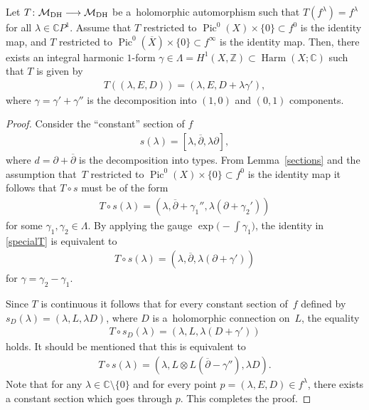 \begin{Lemma}\label{almost-id} Let $T \colon {\mathcal M}_{\rm DH} \longrightarrow {\mathcal M}_{\rm DH}$ be a~holomorphic automorphism such that
$T(f^\lambda) = f^\lambda$ for all $\lambda \in \mathbb CP^1$. Assume that $T$ restricted to $\operatorname{Pic}^0(X)\times\{0\} \subset f^0$ is the
identity map, and $T$ restricted to $\operatorname{Pic}^0(\overline{X})\times\{0\} \subset f^\infty$ is the identity map. Then, there exists an integral harmonic $1$-form $\gamma \in \Lambda = H^1(X, \mathbb Z) \subset \operatorname{Harm}(X; \mathbb C)$ such that $T$ is given by
\begin{gather*}T((\lambda, E, D)) = (\lambda, E, D+\lambda\gamma') ,\end{gather*}
where $\gamma = \gamma'+\gamma''$ is the decomposition into $(1,0)$ and $(0,1)$ components.
\end{Lemma}

\begin{proof}
Consider the ``constant'' section of $f$
\begin{gather*}s(\lambda) = [\lambda, \overline{\partial}, \lambda \partial],\end{gather*}
where $d = \partial+\overline{\partial}$ is the decomposition into types. From Lemma~\ref{sections} and the assumption that~$T$ restricted to $\operatorname{Pic}^0(X)\times\{0\} \subset f^0$ is the identity map it follows that $T\circ s$ must be of the form
\begin{gather}\label{specialT}
T\circ s(\lambda) = (\lambda, \overline{\partial}+\gamma_1'', \lambda (\partial+\gamma_2'))
\end{gather}
for some $\gamma_1, \gamma_2 \in \Lambda$. By applying the gauge $\exp\big({-}\int\gamma_1\big)$, the identity in \eqref{specialT} is equivalent to
\begin{gather*}T\circ s(\lambda) = (\lambda, \overline{\partial}, \lambda (\partial+\gamma'))\end{gather*}
 for $\gamma = \gamma_2-\gamma_1$.

Since $T$ is continuous it follows that for every constant section of~$f$ def\/ined by $s_D(\lambda) = (\lambda, L, \lambda D)$, where $D$ is a~holomorphic connection on~$L$, the equality
\begin{gather*}T\circ s_D(\lambda) = (\lambda, L, \lambda (D+\gamma'))\end{gather*}
holds. It should be mentioned that this is equivalent to
\begin{gather*}T\circ s(\lambda) = (\lambda, L\otimes L(\overline{\partial}-\gamma''), \lambda D) .\end{gather*}
Note that for any $\lambda \in {\mathbb C}\setminus\{0\}$ and for every point $p = (\lambda, E, D) \in f^\lambda$, there exists a constant section
which goes through $p$. This completes the proof.
\end{proof}

